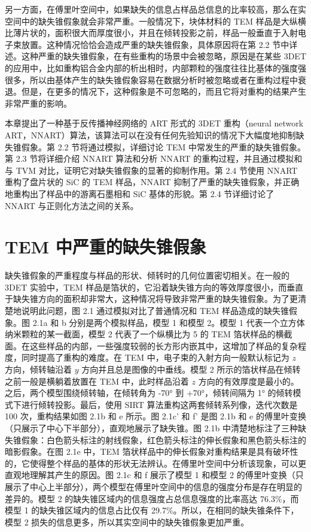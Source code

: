 另一方面，在傅里叶空间中，如果缺失的信息占样品总信息的比率较高，那么在实空间中的缺失锥假象就会非常严重。一般情况下，块体材料的 TEM 样品是大纵横比薄片状的，面积很大而厚度很小，并且在倾转投影之前，样品一般垂直于入射电子束放置。这种情况恰恰会造成严重的缺失锥假象，具体原因将在第 2.2 节中详述。这种严重的缺失锥假象，在有些重构的场景中会被忽略，原因是在某些 3DET 的应用中，比如重构铝合金内部的析出相时，内部颗粒的强度往往比基体的强度强很多，所以由基体产生的缺失锥假象容易在数据分析时被忽略或者在重构过程中衰退。但是，在更多的情况下，这种假象是不可忽略的，而且它将对重构的结果产生非常严重的影响。

本章提出了一种基于反传播神经网络的 ART 形式的 3DET 重构（neural network ART，NNART）算法，该算法可以在没有任何先验知识的情况下大幅度地抑制缺失锥假象。第 2.2 节将通过模拟，详细讨论 TEM 中常发生的严重的缺失锥假象。第 2.3 节将详细介绍 NNART 算法和分析 NNART 的重构过程，并且通过模拟和与 TVM 对比，证明它对缺失锥假象的显著的抑制作用。第 2.4 节使用 NNART 重构了盘片状的 SiC 的 TEM 样品，NNART 抑制了严重的缺失锥假象，并正确地重构出了样品中的游离石墨相和 SiC 基体的形貌。第 2.4 节详细讨论了 NNART 与正则化方法之间的关系。

\section{TEM 中严重的缺失锥假象}

缺失锥假象的严重程度与样品的形状、倾转时的几何位置密切相关。在一般的 3DET 实验中，TEM 样品是箔状的，它沿着缺失锥方向的等效厚度很小，而垂直于缺失锥方向的面积却非常大，这种情况将导致非常严重的缺失锥假象。为了更清楚地说明此问题，图 2.1 通过模拟对比了普通情况和 TEM 样品造成的缺失锥假象。图 2.1a 和 b 分别是两个模拟样品，模型 1 和模型 2。模型 1 代表一个立方体纳米颗粒的某一截面，模型 2 代表了一个纵横比为 5 的 TEM 箔状样品的横截面。在这些样品的内部，一些强度较弱的长方形内嵌其中，这增加了样品的复杂程度，同时提高了重构的难度。在 TEM 中，电子束的入射方向一般默认标记为 $z$ 方向，倾转轴沿着 $y$ 方向并且总是图像的中垂线。模型 2 所示的箔状样品在倾转之前一般是横躺着放置在 TEM 中，此时样品沿着 $z$ 方向的有效厚度是最小的。之后，两个模型围绕倾转轴，在倾转角为 -70° 到 +70°，倾转间隔为 1° 的倾转模式下进行倾转投影。最后，使用 SIRT 算法重构这两套倾转系列像，迭代次数是 100 次，重构结果如图 2.1b 和 e 所示。图 2.1c' 和 f' 是图 2.1b 和 e 的傅里叶变换（只展示了中心下半部分），直观地展示了缺失锥。图 2.1b 中清楚地标注了三种缺失锥假象：白色箭头标注的射线假象，红色箭头标注的伸长假象和黑色箭头标注的暗影假象。在图 2.1e 中，TEM 箔状样品中的伸长假象对重构结果是具有破坏性的，它使得整个样品的基体的形状无法辨认。在傅里叶空间中分析该现象，可以更直观地理解其产生的原因。图 2.1c 和 f 展示了模型 1 和模型 2 的傅里叶变换（只展示了中心上半部分），两个模型在傅里叶空间中的信息的强度分布是存在明显的差异的。模型 2 的缺失锥区域内的信息强度占总信息强度的比率高达 76.3\%，而模型 1 的缺失锥区域内的信息占比仅有 29.7\%。所以，在相同的缺失锥条件下，模型 2 损失的信息更多，所以其实空间中的缺失锥假象更加严重。

